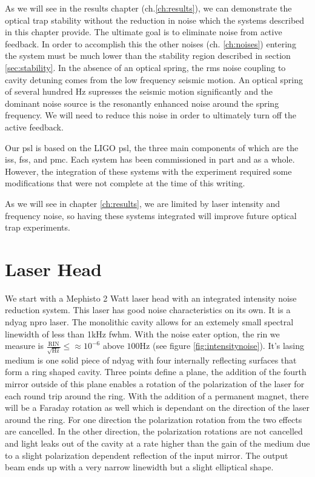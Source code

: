\acresetall

As we will see in the results chapter (ch.\ref{ch:results}), we can demonstrate
the optical trap stability without the reduction in noise which the systems
described in this chapter provide.
The ultimate goal is to eliminate noise from active feedback.
In order to accomplish this the other noises
(ch. \ref{ch:noises}) entering the system must be much lower than the stability
region described in section \ref{sec:stability}.
In the absence of an optical spring, the rms noise coupling to cavity detuning
comes from the low frequency seismic motion.
An optical spring of several hundred Hz supresses the seismic motion
significantly and the dominant noise source is the resonantly enhanced noise
around the spring frequency.
We will need to reduce this noise in order to ultimately turn off the active
feedback.

Our \ac{psl} is based on the LIGO \ac{psl}, the three main components of which
are the \ac{iss}, \ac{fss}, and \ac{pmc}. Each system has been commissioned in
part and as a whole. However, the integration of these systems with the
experiment required some modifications that were not complete at the time of
this writing.

As we will see in chapter \ref{ch:results}, we are limited by laser intensity
and frequency noise, so having these systems integrated will improve
future optical trap experiments.


\section{Laser Head}

We start with a Mephisto 2 Watt laser head with an integrated intensity
noise reduction system.
This laser has good noise characteristics on its own.
It is a \ac{ndyag} \ac{npro} laser. The monolithic cavity allows for an
extemely small spectral linewidth of less than 1kHz \ac{fwhm}.
With the noise eater option, the \ac{rin} we measure is
$\frac{\mathrm{RIN}}{\sqrt{\mathrm{Hz}}}\leq \approx 10^{-6}$
above $100\mathrm{Hz}$ (see figure \ref{fig:intensitynoise}).
It's lasing medium is one solid piece of \ac{ndyag} with four internally
reflecting surfaces that form a ring shaped cavity.
Three points define a plane, the addition of the fourth mirror outside of this
plane enables a rotation of the polarization of the laser for each round trip
around the ring.
With the addition of a permanent magnet, there will be a Faraday rotation as
well which is dependant on the direction of the laser around the ring.
For one direction the polarization rotation from the two effects are cancelled.
In the other direction, the polarization rotations are not cancelled and light
leaks out of the cavity at a rate higher than the gain of the medium due to a
slight polarization dependent reflection of the input mirror.
The output beam ends up with a very narrow linewidth but a slight elliptical
shape.

